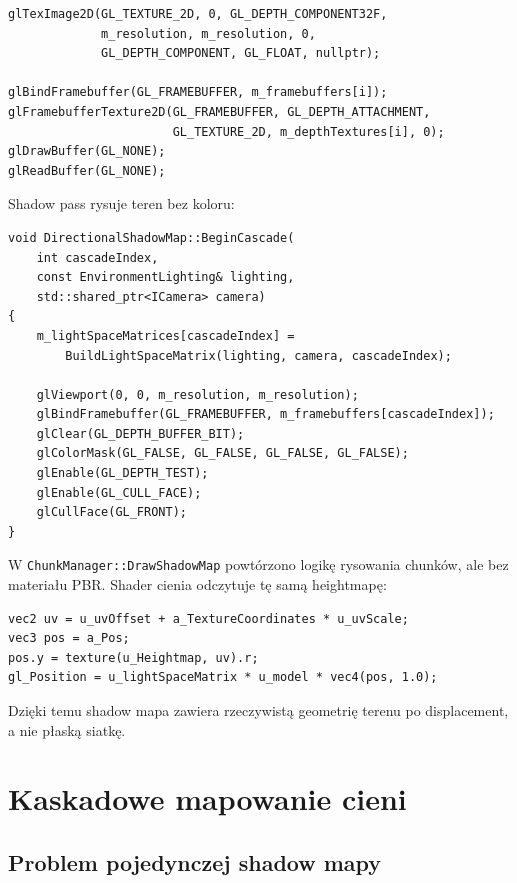 \documentclass[12pt,a4paper]{article}
\begin{document}
\begin{lstlisting}[style=cppstyle,caption={Tworzenie depth texture i podpięcie jej do FBO.}]
glTexImage2D(GL_TEXTURE_2D, 0, GL_DEPTH_COMPONENT32F,
             m_resolution, m_resolution, 0,
             GL_DEPTH_COMPONENT, GL_FLOAT, nullptr);

glBindFramebuffer(GL_FRAMEBUFFER, m_framebuffers[i]);
glFramebufferTexture2D(GL_FRAMEBUFFER, GL_DEPTH_ATTACHMENT,
                       GL_TEXTURE_2D, m_depthTextures[i], 0);
glDrawBuffer(GL_NONE);
glReadBuffer(GL_NONE);
\end{lstlisting}

Shadow pass rysuje teren bez koloru:

\begin{lstlisting}[style=cppstyle,caption={Rozpoczęcie renderowania jednej kaskady shadow mapy.}]
void DirectionalShadowMap::BeginCascade(
    int cascadeIndex,
    const EnvironmentLighting& lighting,
    std::shared_ptr<ICamera> camera)
{
    m_lightSpaceMatrices[cascadeIndex] =
        BuildLightSpaceMatrix(lighting, camera, cascadeIndex);

    glViewport(0, 0, m_resolution, m_resolution);
    glBindFramebuffer(GL_FRAMEBUFFER, m_framebuffers[cascadeIndex]);
    glClear(GL_DEPTH_BUFFER_BIT);
    glColorMask(GL_FALSE, GL_FALSE, GL_FALSE, GL_FALSE);
    glEnable(GL_DEPTH_TEST);
    glEnable(GL_CULL_FACE);
    glCullFace(GL_FRONT);
}
\end{lstlisting}

W \texttt{ChunkManager::DrawShadowMap} powtórzono logikę rysowania chunków, ale bez materiału PBR. Shader cienia odczytuje tę samą heightmapę:

\begin{lstlisting}[style=glslstyle,caption={Vertex shader shadow passu dla terenu.}]
vec2 uv = u_uvOffset + a_TextureCoordinates * u_uvScale;
vec3 pos = a_Pos;
pos.y = texture(u_Heightmap, uv).r;
gl_Position = u_lightSpaceMatrix * u_model * vec4(pos, 1.0);
\end{lstlisting}

Dzięki temu shadow mapa zawiera rzeczywistą geometrię terenu po displacement, a nie płaską siatkę.

\section{Kaskadowe mapowanie cieni}

\subsection{Problem pojedynczej shadow mapy}
\end{document}
